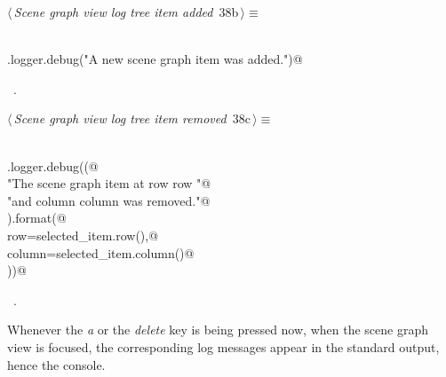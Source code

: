 \documentclass[
    a4paper,      %
    10pt,         %
    openright,    %
    notitlepage,  %
    parskip=half, %
]{scrreprt}       %
\theoremstyle{definition}                    %
\begin{document}
\begin{flushleft} \small
\begin{minipage}{\linewidth}\label{scrap46}\raggedright\small
{} $\langle\,${\itshape Scene graph view log tree item added}\nobreak\ {\footnotesize {38b}}$\,\rangle\equiv$
\vspace{-1ex}
\begin{list}{}{} \item
\mbox{}\lstinline@@\\
\mbox{}\lstinline@self.logger.debug("A new scene graph item was added.")@\\
\mbox{}\lstinline@@{\NWsep}
\end{list}
\vspace{-1.5ex}
\footnotesize
\begin{list}{}{\setlength{\itemsep}{-\parsep}\setlength{\itemindent}{-\leftmargin}}
\item \NWtxtMacroRefIn\ .

\item{}
\end{list}
\end{minipage}\vspace{4ex}
\end{flushleft}
\begin{flushleft} \small
\begin{minipage}{\linewidth}\label{scrap47}\raggedright\small
{} $\langle\,${\itshape Scene graph view log tree item removed}\nobreak\ {\footnotesize {38c}}$\,\rangle\equiv$
\vspace{-1ex}
\begin{list}{}{} \item
\mbox{}\lstinline@@\\
\mbox{}\lstinline@self.logger.debug((@\\
\mbox{}\lstinline@    "The scene graph item at row {row} "@\\
\mbox{}\lstinline@    "and column {column} was removed."@\\
\mbox{}\lstinline@).format(@\\
\mbox{}\lstinline@    row=selected_item.row(),@\\
\mbox{}\lstinline@    column=selected_item.column()@\\
\mbox{}\lstinline@))@\\
\mbox{}\lstinline@@{\NWsep}
\end{list}
\vspace{-1.5ex}
\footnotesize
\begin{list}{}{\setlength{\itemsep}{-\parsep}\setlength{\itemindent}{-\leftmargin}}
\item \NWtxtMacroRefIn\ .

\item{}
\end{list}
\end{minipage}\vspace{4ex}
\end{flushleft}
Whenever the \textit{a} or the \textit{delete} key is being pressed now, when the scene graph
view is focused, the corresponding log messages appear in the standard output,
hence the console.
\end{document}
